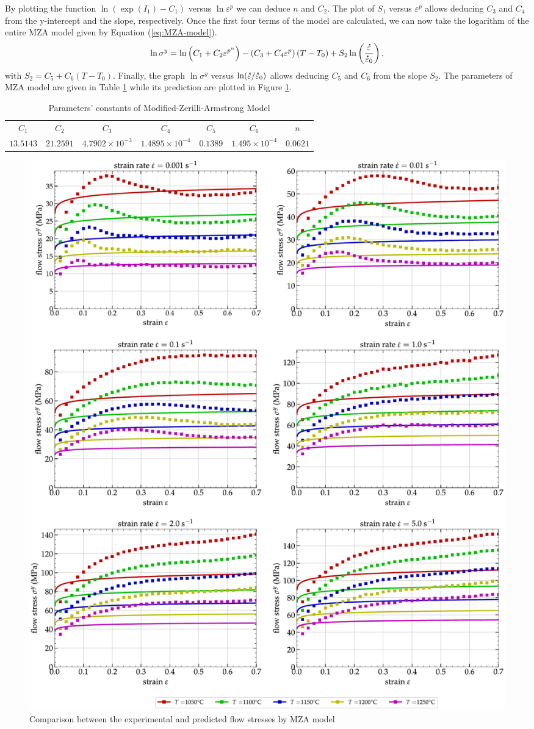 \documentclass[twoside,english,1p,final,sort&compress]{elsarticle}
\theoremstyle{plain}
\DeclareRobustCommand{\mdot}[1]{\accentset{\mbox{\bfseries .}}{#1}}
\begin{document}
By plotting the function $\ln\left(\exp(I_1)-C_1\right)$ versus $\ln\varepsilon^p$ we can deduce $n$ and $C_2$.
The plot of $S_1$ versus $\varepsilon^p$ allows deducing $C_3$ and $C_4$ from the y-intercept and the slope, respectively.
Once the first four terms of the model are calculated, we can now take the logarithm of the entire MZA model given by Equation (\ref{eq:MZA-model}).
\begin{equation}
\ln\sigma^y = \ln\left(C_{1}+C_{2}\varepsilon^{p^n}\right) - \left(C_{3}+C_{4}\varepsilon^p\right)\left(T-T_0\right) + S_2\ln\left( \frac{\mdot\varepsilon}{\mdot{\varepsilon}_0}\right),
\end{equation}
with $S_2=C_5+C_6\left(T-T_0\right)$.
Finally, the graph $\ln\sigma^y$ versus $ \ln(\mdot\varepsilon/\mdot{\varepsilon}_0)$ allows deducing $C_5$ and $C_6$ from the slope $S_2$.
The parameters of MZA model are given in Table \ref{tab:MZA} while its prediction are plotted in Figure \ref{fig:CompExp-MZA-6}.
\begin{table}[h!]
\centering{}
\caption{Parameters' constants of Modified-Zerilli-Armstrong Model}
\begin{tabular}{ccccccc}
	\hline
	  $C_1$   &   $C_2$   &         $C_3$          &         $C_4$          &  $C_5$   &         $C_6$         &   $n$    \\
	$13.5143$ & $21.2591$ & $4.7902\times 10^{-3}$ & $1.4895\times 10^{-4}$ & $0.1389$ & $1.495\times 10^{-4}$ & $0.0621$ \\ \hline
\end{tabular}
\label{tab:MZA}
\end{table}
\begin{figure}[!ht]
\centering
\includegraphics[width=\columnwidth]
{Figures/CompExp-MZA-6}
\caption{Comparison between the experimental and predicted flow stresses by MZA model}
\label{fig:CompExp-MZA-6}
\end{figure}
\end{document}
